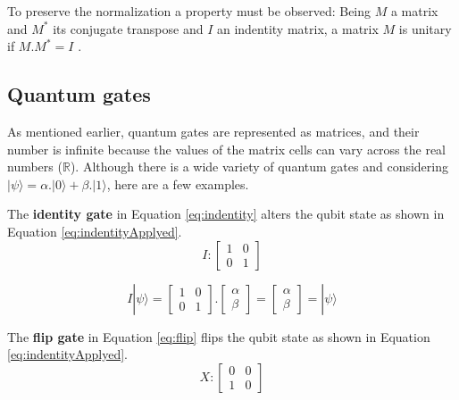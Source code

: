 		\par To preserve the normalization a property must be observed: Being $M$ a matrix and $M^*$ its conjugate transpose and $I$ an indentity matrix, a matrix $M$ is unitary if $M.M^* = I$ \cite{da2018introduccao}.
		
		\subsection{Quantum gates}
		
			\par As mentioned earlier, quantum gates are represented as matrices, and their number is infinite because the values of the matrix cells can vary across the real numbers ($\mathbb{R}$). Although there is a wide variety of quantum gates and considering $| \psi \rangle = \alpha . | 0 \rangle + \beta . | 1 \rangle$, here are a few examples.\newline

		
			\par The \textbf{identity gate} in Equation \ref{eq:indentity} alters the qubit state as shown in Equation \ref{eq:indentityApplyed}.
			\begin{equation}
				\label{eq:indentity}
					I : 
					\begin{bmatrix}
						1& 0 \\
						0& 1
					\end{bmatrix}
			\end{equation}

			\begin{equation}
				\label{eq:indentityApplyed}
				I|\psi\rangle = \begin{bmatrix}
					1& 0 \\
					0& 1
				\end{bmatrix} . \begin{bmatrix}
					\alpha \\
					\beta
				\end{bmatrix} = \begin{bmatrix}
					\alpha \\
					\beta
				\end{bmatrix} = |\psi\rangle
			\end{equation}
		
			\par The \textbf{flip gate} in Equation \ref{eq:flip} flips the qubit state as shown in Equation \ref{eq:indentityApplyed}.
			\begin{equation}
				\label{eq:flip}
				X : 
				\begin{bmatrix}
					0& 0 \\
					1& 0
				\end{bmatrix}
			\end{equation}
			
